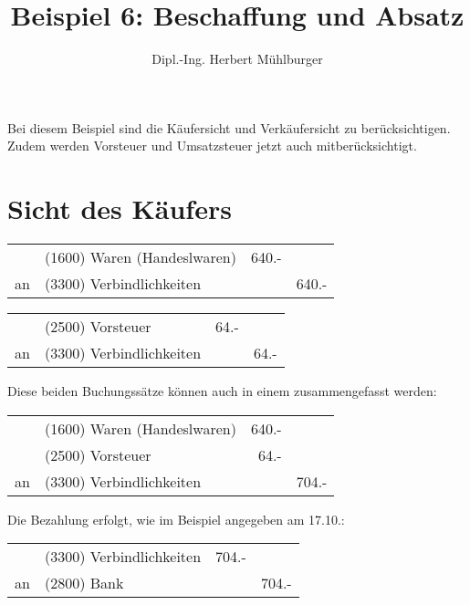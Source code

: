 \documentclass[parskip=half,12pt,a4paper]{scrartcl}
\begin{document}
\title{Beispiel 6: Beschaffung und Absatz}
\author{Dipl.-Ing. Herbert Mühlburger}
\maketitle

Bei diesem Beispiel sind die Käufersicht und Verkäufersicht zu berücksichtigen. Zudem werden Vorsteuer und Umsatzsteuer jetzt auch mitberücksichtigt.

\section{Sicht des Käufers}

\begin{center}
	\begin{tabularx}{\textwidth}{rXrr}
		\toprule
		& (1600) Waren (Handeslwaren) & 640.- &\\
		an & (3300) Verbindlichkeiten & & 640.-\\
		\bottomrule
	\end{tabularx}
\end{center}

\begin{center}
	\begin{tabularx}{\textwidth}{rXrr}
		\toprule
		& (2500) Vorsteuer & 64.- &\\
		an & (3300) Verbindlichkeiten & & 64.-\\
		\bottomrule
	\end{tabularx}
\end{center}

Diese beiden Buchungssätze können auch in einem zusammengefasst werden:

\begin{center}
	\begin{tabularx}{\textwidth}{rXrr}
		\toprule
		& (1600) Waren (Handeslwaren) & 640.- &\\
		& (2500) Vorsteuer & 64.- &\\
		an & (3300) Verbindlichkeiten & & 704.-\\
		\bottomrule
	\end{tabularx}
\end{center}

Die Bezahlung erfolgt, wie im Beispiel angegeben am 17.10.:

\begin{center}
	\begin{tabularx}{\textwidth}{rXrr}
		\toprule
		& (3300) Verbindlichkeiten & 704.- &\\
		an & (2800) Bank & & 704.-\\
		\bottomrule
	\end{tabularx}
\end{center}
\end{document}
